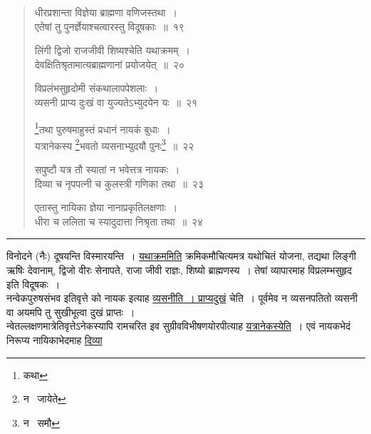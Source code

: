 \documentclass[11pt, openany]{book}
\begin{document}
\begin{quote}
{\na धीरप्रशान्ता विज्ञेया ब्राह्मणा वणिजस्तथा~।\\
एतेषां तु पुनर्ज्ञेयाश्चत्वारस्तु विदूषकाः~॥~१९

लिंगी द्विजो राजजीवी शिष्यश्चेति यथाक्रमम्~।\\
देवक्षितिश्रृतामात्यब्राह्मणानां प्रयोजयेत्~॥~२०

विप्रलंभसुहृदोमी संकथालापपेशलाः~।\\
व्यसनी प्राप्य दुःखं वा युज्यतेऽभ्युदयेन यः~॥~२१

\renewcommand{\thefootnote}{1}\footnote{कथा}तथा पुरुषमाहुस्तं प्रधानं नायकं बुधाः~।\\
यत्रानेकस्य \renewcommand{\thefootnote}{2}\footnote{न \textendash\  जायेते}भवतो व्यसनाभ्युदयौ पुनः\renewcommand{\thefootnote}{3}\footnote{न \textendash\  समौ}~॥~२२

सपुष्टौ यत्र तौ स्यातां न भवेत्तत्र नायकः~।\\
दिव्या च नृपपत्नी च कुलस्त्री गणिका तथा~॥~२३

एतास्तु नायिका ज्ञेया नानाप्रकृतिलक्षणाः~।\\
धीरा च ललिता च स्यादुदात्ता निश्रृता तथा~॥~२४}
\end{quote}

\hrule

\vspace{2mm}
\noindent
विनोदने (नैः) दूषयन्ति विस्मारयन्ति~। \underline{यथाक्रममिति} क्रमिकमौचित्यमत्र यथोचितं योजना, तद्यथा लिङ्गी ऋषिः देवानाम्, द्विजो वीरः सेनापते, राजा जीवी राज्ञः, शिष्यो ब्राह्मणस्य~। तेषां व्यापारमाह विप्रलम्भसुहृद इति विदूषकः~।\\

नन्वेकपुरुषसंभव इतिवृत्ते को नायक इत्याह \underline{व्यसनीति~। प्राप्यदुखं} चेति~। पूर्वमेव न व्यसनपतितो व्यसनी वा अयमपि तु सुखीभूत्वा दुखं प्राप्तः~।\\

न्वेतल्लक्षणमात्रेतिवृत्तेऽनेकस्यापि रामचरित इव सुग्रीवविभीषणयोरपीत्याह \underline{यत्रानेकस्येति}~। एवं नायकभेदं निरूप्य नायिकाभेदमाह \underline{दिव्या\textendash }

\newpage
\end{document}
